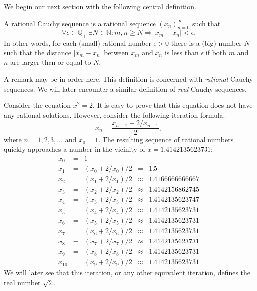 \documentclass{tstextbook}
\begin{document}
We begin our next section with the following central definition.

\begin{definition}
  \label{th:rationalcauchysequence}
  A rational Cauchy sequence is a rational sequence
  $(x_n)_{n=0}^{\infty}$ such that
  \begin{equation}
    \forall \epsilon \in \mathbb{Q}_+ \;
    \exists N \in \mathbb{N} : m, n \geq N \Rightarrow |x_m - x_n| < \epsilon.
  \end{equation}
  In other words, for each (small) rational number $\epsilon > 0$
  there is a (big) number $N$ such that the distance $|x_m - x_n|$
  between $x_m$ and $x_n$ is less than $\epsilon$ if both $m$ and $n$
  are larger than or equal to $N$.
\end{definition}

\begin{remark}
  A remark may be in order here. This definition is concerned with
  \emph{rational} Cauchy sequences. We will later encounter a similar
  definition of \emph{real} Cauchy sequences.
\end{remark}

\begin{example}[Solving the equation $x^2 = 2$]
  Consider the equation $x^2 = 2$. It is easy to prove that this
  equation does not have any rational solutions. However, consider
  the following iteration formula:
  \begin{equation}
    x_n = \frac{x_{n-1} + 2 / x_{n - 1}}{2},
  \end{equation}
  where $n = 1,2,3,\ldots$ and $x_0 = 1$. The resulting sequence of
  rational numbers quickly approaches a number in the vicinity of
  $x = 1.4142135623731$:
  \begin{displaymath}
    \begin{array}{rclcl}
      x_0 &=& 1 \\
      x_{1} &=& (x_{0} + 2 / x_{0}) / 2 &=& 1.5 \\
      x_{2} &=& (x_{1} + 2 / x_{1}) / 2 &\approx& 1.4166666666667 \\
      x_{3} &=& (x_{2} + 2 / x_{2}) / 2 &\approx& 1.4142156862745 \\
      x_{4} &=& (x_{3} + 2 / x_{3}) / 2 &\approx& 1.4142135623747 \\
      x_{5} &=& (x_{4} + 2 / x_{4}) / 2 &\approx& 1.4142135623731 \\
      x_{6} &=& (x_{5} + 2 / x_{5}) / 2 &\approx& 1.4142135623731 \\
      x_{7} &=& (x_{6} + 2 / x_{6}) / 2 &\approx& 1.4142135623731 \\
      x_{8} &=& (x_{7} + 2 / x_{7}) / 2 &\approx& 1.4142135623731 \\
      x_{9} &=& (x_{8} + 2 / x_{8}) / 2 &\approx& 1.4142135623731 \\
      x_{10} &=& (x_{9} + 2 / x_{9}) / 2 &\approx& 1.4142135623731
    \end{array}
  \end{displaymath}
  We will later see that this iteration, or any other equivalent
  iteration, defines the real number $\sqrt{2}$.
\end{example}
\end{document}
